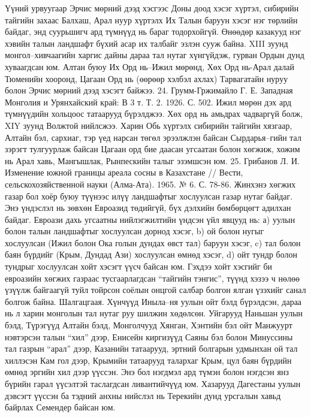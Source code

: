 Үүний урвуугаар Эрчис мөрний дээд хэсгээс Доны доод хэсэг хүртэл, сибирийн тайгийн захаас Балхаш, Арал нуур хүртэлх Их Талын баруун хэсэг нэг төрлийн байдаг, энд суурьшигч ард түмнүүд нь бараг тодорхойгүй. Өнөөдөр казакууд нэг хэвийн талын ландшафт бүхий асар их талбайг эзлэн сууж байна. XIII зуунд монгол–хивчаагийн харгис дайны дараа тал нутаг хүнгүйдэж, гурван Ордын дунд хуваагдсан юм. Алтан буюу Их Орд нь–Ижил мөрөнд, Хөх Орд нь-Арал далай Тюменийн хооронд, Цагаан Орд нь (өөрөөр хэлбэл ахлах) Тарвагатайн нуруу болон Эрчис мөрний дээд хэсэгт байжээ. 24. Грумм-Гржимайло Г. Е. Западная Монголия и Урянхайский край: В 3 т. Т. 2. 1926. С. 502.
Ижил мөрөн дэх ард түмнүүдийн хольцоос татаарууд бүрэлджээ. Хөх орд нь амьдрах чадваргүй болж, XIY зуунд Волжтой нийлсжээ. Харин Обь хүртэлх сибирийн тайгийн хязгаар, Алтайн бэл, сархиаг, тэр үед нарсан төгөл эрээлжлэн байсан Сырдарья–гийн тал зэрэгт тулгуурлаж байсан Цагаан орд бие даасан угсаатан болон хөгжиж, хожим нь Арал хавь, Мангышлак, Рынпескийн талыг эзэмшсэн юм. 25. Грибанов Л. И. Изменение южной границы ареала сосны в Казахстане // Вести, сельскохозяйственной науки (Алма-Ата). 1965. № 6. С. 78-86.
Жинхэнэ хөгжих газар бол хоёр буюу түүнээс илүү ландшафтыг хослуулсан газар нутаг байдаг. Энэ үндэслэл нь зөвхөн Евроазид төдийгүй, бүх дэлхийн бөмбөрцөгт адилхан байдаг. Евроази дахь угсаатны нийлэгжилтийн үндсэн үйл явцууд нь: а) уулын болон талын ландшафтыг хослуулсан дорнод хэсэг, b) ой болон нугыг хослуулсан (Ижил болон Ока голын дундах өвст тал) баруун хэсэг, c) тал болон баян бүрдийг (Крым, Дундад Ази) хослуулсан өмнөд хэсэг, d) ойт тундр болон тундрыг хослуулсан хойт хэсэгт үүсч байсан юм. Гэхдээ хойт хэсгийг би евроазийн хөгжих газраас тусгаарлагдсан “тайгийн тэнгис”, түүнд хэзээ ч нөлөө үзүүлж байгаагүй туйл тойрсон соёлын онцгой салбар болгон ялган үзэхийг санал болгож байна.
Шалгацгаая. Хүнчүүд Иныла–ня уулын ойт бэлд бүрэлдсэн, дараа нь л харин монголын тал нутаг руу шилжин хөдөлсөн. Уйгарууд Наньшан уулын бэлд, Түрэгүүд Алтайн бэлд, Монголчууд Хянган, Хэнтийн бэл ойт Манжуурт нэвтэрсэн талын “хил” дээр, Енисейн киргизүүд Саяны бэл болон Минуссины тал газрын “арал” дээр, Казанийн татаарууд, эртний болгарын удмынхан ой тал хиллэсэн Кам гол дээр, Крымийн татаарууд талархаг Крым, цул баян бүрдийн өмнөд эргийн хил дээр үүссэн. Энэ бол нэгдмэл ард түмэн болон нэгдсэн янз бүрийн гарал үүсэлтэй таслагдсан ливантийчүүд юм. Хазарууд Дагестаны уулын дэвсэгт үүссэн ба тэдний анхны нийслэл нь Терекийн дунд урсгалын хавьд байрлах Семендер байсан юм.
